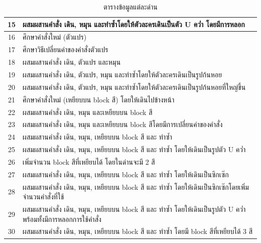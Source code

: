 \begin{center}
\begin{table}[H]
\begin{center}
\begin{tabularx}{\textwidth}{|c | X|}
             \hline
             15 &  ผสมผสานคำสั่ง เดิน, หมุน และทำซ้ำโดยให้ตัวละครเดินเป็นตัว U คว่ำ โดยมีการหลอก \\ 
             \hline
             16 &  ศึกษาคำสั่งใหม่ (ตัวแปร) \\ 
             \hline
             17 &  ศึกษาวิธีเปลี่ยนค่าของคำสั่งตัวแปร \\ 
             \hline
             18 &  ผสมผสานคำสั่ง เดิน, ตัวแปร และหมุน \\ 
             \hline
             19 &  ผสมผสานคำสั่ง เดิน, ตัวแปร, หมุน และทำซ้ำโดยให้ตัวละครเดินเป็นรูปก้นหอย \\ 
             \hline
             20 &  ผสมผสานคำสั่ง เดิน, ตัวแปร, หมุน และทำซ้ำโดยให้ตัวละครเดินเป็นรูปก้นหอยที่ใหญ่ขึ้น \\ 
             \hline
             21 &  ศึกษาคำสั่งใหม่ (เหยียบบน block สี) โดยให้เดินไปข้างหน้า \\ 
             \hline
             22 &  ผสมผสานคำสั่ง เดิน, หมุน และเหยียบบน block สี \\ 
             \hline
             23 &  ผสมผสานคำสั่ง เดิน, หมุน และเหยียบบน block สีโดยมีการเปลี่ยนค่าของคำสั่ง \\ 
             \hline
             24 &  ผสมผสานคำสั่ง เดิน, หมุน, เหยียบบน block สี และ ทำซ้ำ \\ 
             \hline
             25 &  ผสมผสานคำสั่ง เดิน, หมุน, เหยียบบน block สี และ ทำซ้ำ โดยให้เดินเป็นรูปตัว U คว่ำ \\ 
             \hline
             26 &  เพิ่มจำนวน block สีที่เหยียบได้ โดยในด่านจะมี 2 สี \\ 
             \hline
             27 &  ผสมผสานคำสั่ง เดิน, หมุน, เหยียบบน block สี และ ทำซ้ำ โดยให้เดินเป็นซิกเซ๊ก \\ 
             \hline
             28 &  ผสมผสานคำสั่ง เดิน, หมุน, เหยียบบน block สี และ ทำซ้ำ โดยให้เดินเป็นซิกเซ๊กโดยเพิ่มจำนวนคำสั่งที่ใช้ \\ 
             \hline
             29 &  ผสมผสานคำสั่ง เดิน, หมุน, เหยียบบน block สี และ ทำซ้ำ โดยให้เดินเป็นรูปตัว U คว่ำพร้อมทั้งมีการหลอกการใช้คำสั่ง \\ 
             \hline
             30 &  ผสมผสานคำสั่ง เดิน, หมุน, เหยียบบน block สี และ ทำซ้ำ โดยมี block สีที่เหยียบได้ 3 สี \\ 
             \hline
            \end{tabularx}
        \end{center}
        \caption[ตารางข้อมูลแต่ละด่าน]{ตารางข้อมูลแต่ละด่าน}
        \label{maptable}
    \end{table}
\end{center}

